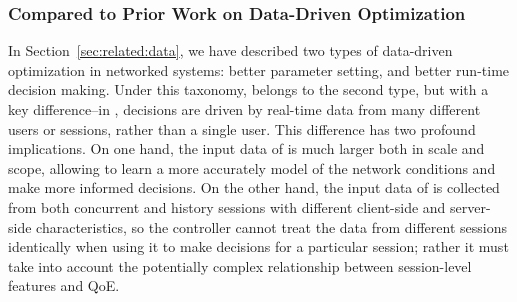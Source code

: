 
\subsubsection{Compared to Prior Work on Data-Driven Optimization}

In Section~\ref{sec:related:data}, we have described two types
of data-driven optimization in networked systems:
better parameter setting, and better run-time decision making.
Under this taxonomy, \ddn belongs to the second type, but with a 
key difference--in \ddn, decisions are driven by real-time data from 
many different
users or sessions, rather than a single user. 
This difference has two profound implications.
On one hand, the input data of \ddn is much larger both in scale 
and scope, allowing \ddn to learn a more accurately model
of the network conditions and make more informed decisions.
On the other hand, the input data of \ddn is collected from both
concurrent and history sessions with different client-side and
server-side characteristics, so the \ddn controller
cannot treat the data from different sessions identically when
using it to make decisions for a particular session; rather
it must take into account the potentially 
complex relationship between session-level 
features and QoE.


